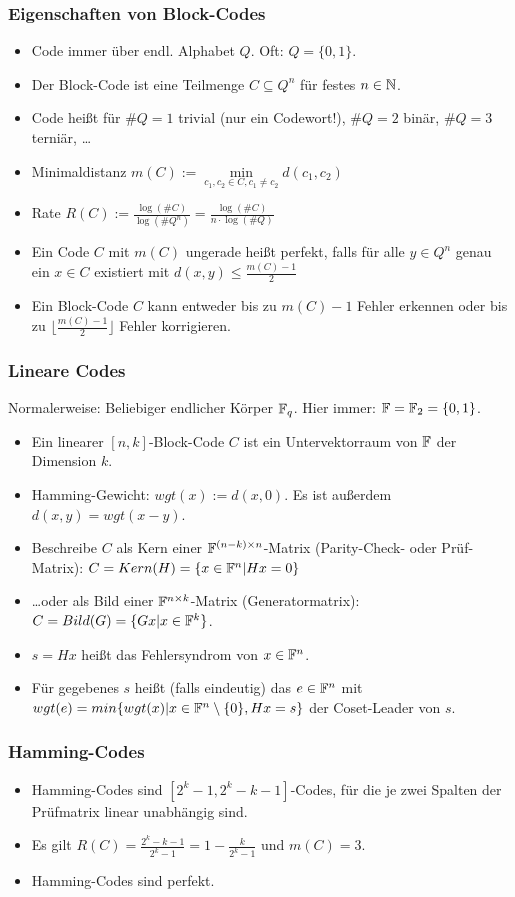 \documentclass{beamer}
\newcommand{\F}{\ensuremath \mathbb{F}}
\newcommand{\N}{\ensuremath \mathbb{N}}
\begin{document}
\begin{frame}
\frametitle{Eigenschaften von Block-Codes}
\begin{itemize}
\item Code immer über endl. Alphabet $Q$. Oft: $Q=\{0,1\}$.
\item Der Block-Code ist eine Teilmenge $C\subseteq Q^n$ für festes $n\in\N$.
\item Code heißt für $\#Q=1$ trivial (nur ein Codewort!), $\#Q=2$ binär, $\#Q=3$ terniär, \ldots\pause
\item Minimaldistanz $m(C):=\min\limits_{c_1,c_2\in C,c_1\neq c_2} d(c_1,c_2)$
\item Rate $R(C):=\frac{\log(\#C)}{\log(\#Q^n)}=\frac{\log(\#C)}{n\cdot\log(\#Q)}$
\item Ein Code $C$ mit $m(C)$ ungerade heißt perfekt, falls für alle $y\in Q^n$ genau ein $x\in C$ existiert mit $d(x,y)\leq \frac{m(C)-1}{2}$\pause
\item Ein Block-Code $C$ kann entweder bis zu $m(C)-1$ Fehler erkennen oder bis zu $\lfloor\frac{m(C)-1}{2}\rfloor$ Fehler korrigieren.
\end{itemize}
\end{frame}

\begin{frame}
\frametitle{Lineare Codes}
Normalerweise: Beliebiger endlicher Körper $\F_q$. Hier immer: $\F=\F_2=\{0,1\}$.
\begin{itemize}
\item Ein linearer $[n,k]$-Block-Code $C$ ist ein Untervektorraum von $\F$ der Dimension $k$.\pause
\item Hamming-Gewicht: $wgt(x):=d(x,0)$. Es ist außerdem $d(x,y)=wgt(x-y)$.\pause
\item Beschreibe $C$ als Kern einer $\F^{(n-k)\times n}$-Matrix (Parity-Check- oder Prüf-Matrix): $C=Kern(H)=\{x\in\F^n|Hx=0\}$
\item \ldots oder als Bild einer $\F^{n\times k}$-Matrix (Generatormatrix): $C=Bild(G)=\{Gx|x\in\F^k\}$.\pause
\item $s=Hx$ heißt das Fehlersyndrom von $x\in\F^n$.\pause
\item Für gegebenes $s$ heißt (falls eindeutig) das $e\in\F^n$ mit
$wgt(e) = min\{wgt(x)|x \in \F^n\setminus\{0\}, Hx=s\}$ der Coset-Leader von $s$.
\end{itemize}
\end{frame}

\begin{frame}
\frametitle{Hamming-Codes}
\begin{itemize}
\item Hamming-Codes sind $[2^k - 1, 2^k - k - 1]$-Codes, für die je
zwei Spalten der Prüfmatrix linear unabhängig sind.\pause
\item Es gilt $R(C)=\frac{2^k-k-1}{2^k-1}=1-\frac{k}{2^k-1}$ und $m(C)=3$.
\item Hamming-Codes sind perfekt.
\end{itemize}
\end{frame}
\end{document}
